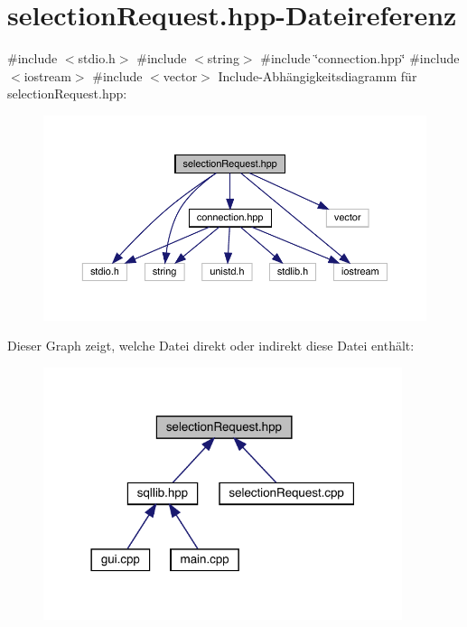 \section{selection\+Request.\+hpp-\/\+Dateireferenz}
\label{selection_request_8hpp}
{\ttfamily \#include $<$stdio.\+h$>$}\newline
{\ttfamily \#include $<$string$>$}\newline
{\ttfamily \#include \char`\"{}connection.\+hpp\char`\"{}}\newline
{\ttfamily \#include $<$iostream$>$}\newline
{\ttfamily \#include $<$vector$>$}\newline
Include-\/\+Abhängigkeitsdiagramm für selection\+Request.\+hpp\+:\nopagebreak
\begin{figure}[H]
\begin{center}
\leavevmode
\includegraphics[width=350pt]{selection_request_8hpp__incl}
\end{center}
\end{figure}
Dieser Graph zeigt, welche Datei direkt oder indirekt diese Datei enthält\+:\nopagebreak
\begin{figure}[H]
\begin{center}
\leavevmode
\includegraphics[width=298pt]{selection_request_8hpp__dep__incl}
\end{center}
\end{figure}
